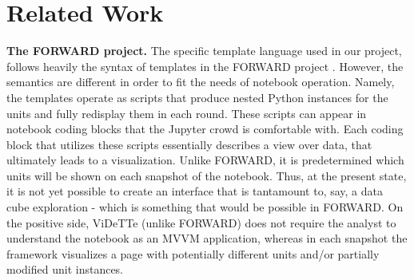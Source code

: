 \section{Related Work}
\label{section:related-work}


{\bf The FORWARD project.} The specific template language used in our project, follows heavily the syntax of templates in the FORWARD project \cite{SIGMOD2010,CIDR2011}. However, the semantics are different in order to fit the needs of notebook operation. Namely, the templates operate as scripts that produce nested Python instances for the units and fully redisplay them in each round. These scripts can appear in notebook coding blocks that the Jupyter crowd is comfortable with. Each coding block that utilizes these scripts essentially describes a view over data, that ultimately leads to a visualization. Unlike FORWARD, it is predetermined which units will be shown on each snapshot of the notebook. Thus, at the present state, it is not yet possible to create an interface that is tantamount to, say, a data cube exploration - which is something that would be possible in FORWARD. On the positive side, ViDeTTe (unlike FORWARD) does not require the analyst to understand the notebook as an MVVM application, whereas in each snapshot the framework visualizes a page with potentially different units and/or partially modified unit instances. 

